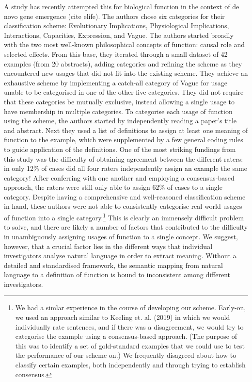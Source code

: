 \documentclass{article}
\begin{document}
A study has recently attempted this for biological function in the context of de novo gene emergence (cite elife).
The authors chose six categories for their classification scheme: Evolutionary Implications, Physiological Implications, Interactions, Capacities, Expression, and Vague.
The authors started broadly with the two most well-known philosophical concepts of function: causal role and selected effects.
From this base, they iterated through a small dataset of 42 examples (from 20 abstracts), adding categories and refining the scheme as they encountered new usages that did not fit into the existing scheme.
They achieve an exhaustive scheme by implementing a catch-all category of Vague for usage unable to be categorised in one of the other five categories.
They did not require that these categories be mutually exclusive, instead allowing a single usage to have membership in multiple categories.
To categorise each usage of function using the scheme, the authors started by independently reading a paper's title and abstract.
Next they used a list of definitions to assign at least one meaning of function to the example, which were supplemented by a few general coding rules to guide application of the definitions.
One of the most striking fundings from this study was the difficulty of obtaining agreement between the different raters: in only 12\% of cases did all four raters independently assign an example the same category!
After conferring with one another and employing a consensus-based approach, the raters were still only able to assign 62\% of cases to a single category.
Despite having a comprehensive and well-reasoned classification scheme in hand, these authors were not able to consistently categorise real-world usages of function into a single category.\footnote{We had a simlar experience in the course of developing our scheme. Early-on, we used an approach similar to Keeling et. al. (2019) in which we would individually rate sentences, and if there was a disagreement, we would try to categorise the example using a consensus-based approach. (The purpose of this was to identify a set of gold-standard examples that we could use to test the performance of our scheme on.) We frequently disagreed about how to classify certain examples, both independently and through trying to establish consensus.}
This is clearly an immensely difficult problem to solve, and there are likely a number of factors that contributed to the difficulty in unambiguously assigning usages of function to a single concept.
We suggest, however, that a crucial factor lies in the different ways that individual investigators analyse natural language in order to extract meaning.
Without a detailed and standardised framework, the semantic mapping from natural language to a definition of function is bound to inconsistent among different investigators.
\end{document}
